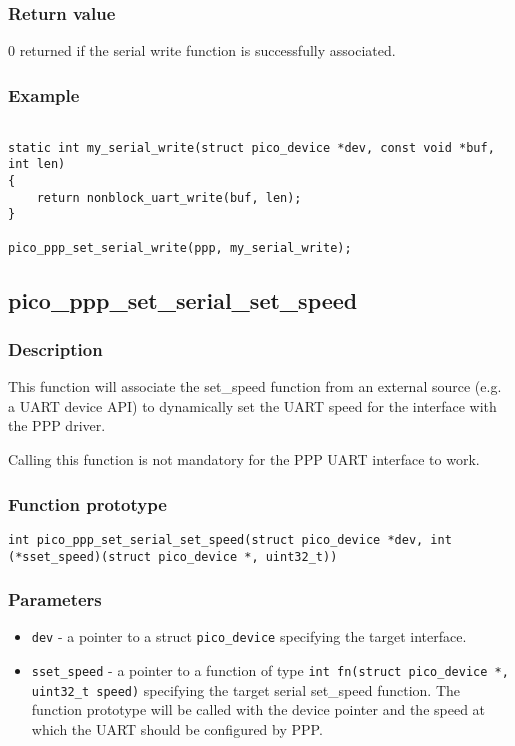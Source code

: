 \subsubsection*{Return value}
0 returned if the serial write function is successfully associated.

\subsubsection*{Example}
\begin{verbatim}

static int my_serial_write(struct pico_device *dev, const void *buf, int len)
{
    return nonblock_uart_write(buf, len);
}

pico_ppp_set_serial_write(ppp, my_serial_write);
\end{verbatim}

\subsection{pico\_ppp\_set\_serial\_set\_speed}
\subsubsection*{Description}
This function will associate the set\_speed function from an external source (e.g. a UART device API)
to dynamically set the UART speed for the interface with the PPP driver. 

Calling this function is not mandatory for the PPP UART interface to work. 

\subsubsection*{Function prototype}
\texttt{int pico\_ppp\_set\_serial\_set\_speed(struct pico\_device *dev, int (*sset\_speed)(struct pico\_device *, uint32\_t))}

\subsubsection*{Parameters}
\begin{itemize}[noitemsep]
\item \texttt{dev} - a pointer to a struct \texttt{pico\_device} specifying the target interface.
\item \texttt{sset\_speed} - a pointer to a function of type \texttt{int fn(struct pico\_device *, uint32\_t speed)} 
    specifying the target serial set\_speed function. The function prototype will be called with the device pointer and
    the speed at which the UART should be configured by PPP.
\end{itemize}

